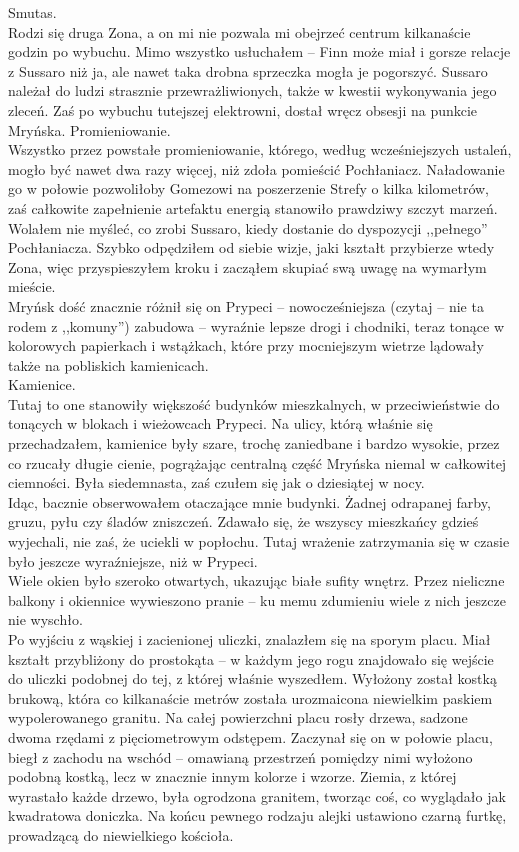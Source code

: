 \documentclass[../MAIN.tex]{subfiles}
\begin{document}
Smutas.\\
Rodzi się druga Zona, a on mi nie pozwala mi obejrzeć centrum kilkanaście godzin po wybuchu. Mimo wszystko usłuchałem -- Finn może miał i gorsze relacje z Sussaro niż ja, ale nawet taka drobna sprzeczka mogła je pogorszyć. Sussaro należał do ludzi strasznie przewrażliwionych, także w kwestii wykonywania jego zleceń. Zaś po wybuchu tutejszej elektrowni, dostał wręcz obsesji na punkcie Mryńska. Promieniowanie.\\
Wszystko przez powstałe promieniowanie, którego, według wcześniejszych ustaleń, mogło być nawet dwa razy więcej, niż zdoła pomieścić Pochłaniacz. Naładowanie go w połowie pozwoliłoby Gomezowi na poszerzenie Strefy o kilka kilometrów, zaś całkowite zapełnienie artefaktu energią stanowiło prawdziwy szczyt marzeń. Wolałem nie myśleć, co zrobi Sussaro, kiedy dostanie do dyspozycji ,,pełnego'' Pochłaniacza. Szybko odpędziłem od siebie wizje, jaki kształt przybierze wtedy Zona, więc przyspieszyłem kroku i zacząłem skupiać swą uwagę na wymarłym mieście.\\
Mryńsk dość znacznie różnił się on Prypeci -- nowocześniejsza (czytaj -- nie ta rodem z ,,komuny'') zabudowa -- wyraźnie lepsze drogi i chodniki, teraz tonące w kolorowych papierkach i wstążkach, które przy mocniejszym wietrze lądowały także na pobliskich kamienicach.\\
Kamienice.\\
Tutaj to one stanowiły większość budynków mieszkalnych, w przeciwieństwie do tonących w blokach i wieżowcach Prypeci. Na ulicy, którą właśnie się przechadzałem, kamienice były szare, trochę zaniedbane i bardzo wysokie, przez co rzucały długie cienie, pogrążając centralną część Mryńska niemal w całkowitej ciemności. Była siedemnasta, zaś czułem się jak o dziesiątej w nocy.\\
Idąc, bacznie obserwowałem otaczające mnie budynki. Żadnej odrapanej farby, gruzu, pyłu czy śladów zniszczeń. Zdawało się, że wszyscy mieszkańcy gdzieś wyjechali, nie zaś, że uciekli w popłochu. Tutaj wrażenie zatrzymania się w czasie było jeszcze wyraźniejsze, niż w Prypeci.\\
Wiele okien było szeroko otwartych, ukazując białe sufity wnętrz. Przez nieliczne balkony i okiennice wywieszono pranie -- ku memu zdumieniu wiele z nich jeszcze nie wyschło.\\
Po wyjściu z wąskiej i zacienionej uliczki, znalazłem się na sporym placu. Miał kształt przybliżony do prostokąta -- w każdym jego rogu znajdowało się wejście do uliczki podobnej do tej, z której właśnie wyszedłem. Wyłożony został kostką brukową, która co kilkanaście metrów została urozmaicona niewielkim paskiem wypolerowanego granitu. Na całej powierzchni placu rosły drzewa, sadzone dwoma rzędami z pięciometrowym odstępem. Zaczynał się on w połowie placu, biegł z zachodu na wschód -- omawianą przestrzeń pomiędzy nimi wyłożono podobną kostką, lecz w znacznie innym kolorze i wzorze. Ziemia, z której wyrastało każde drzewo, była ogrodzona granitem, tworząc coś, co wyglądało jak kwadratowa doniczka. Na końcu pewnego rodzaju alejki ustawiono czarną furtkę, prowadzącą do niewielkiego kościoła.\\
\end{document}

